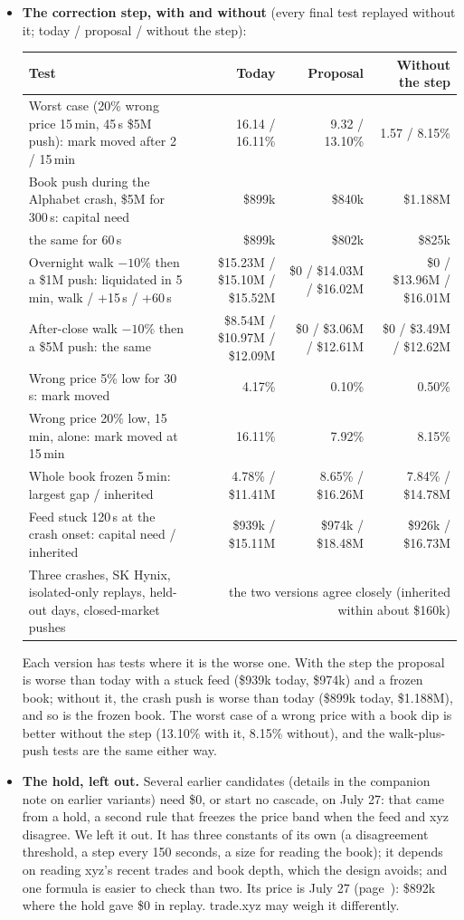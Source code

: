 \documentclass[10.5pt,a4paper]{article}
\begin{document}
{\begin{itemize}[leftmargin=1.2em,itemsep=.2ex,topsep=.3ex]
\item \textbf{The correction step, with and without} (every final test replayed without it; today / proposal / without the step):\par
{\footnotesize\begin{tabularx}{\linewidth}{@{}>{\raggedright\arraybackslash}Xrrr@{}}
\toprule
Test & Today & Proposal & Without the step\\
\midrule
Worst case (20\% wrong price 15\,min, 45\,s \$5M push): mark moved after 2 / 15\,min & 16.14 / 16.11\% & 9.32 / 13.10\% & 1.57 / 8.15\%\\
Book push during the Alphabet crash, \$5M for 300\,s: capital need & \$899k & \$840k & \$1.188M\\
\quad the same for 60\,s & \$899k & \$802k & \$825k\\
Overnight walk $-10\%$ then a \$1M push: liquidated in 5\,min, walk / +15\,s / +60\,s & \$15.23M / \$15.10M / \$15.52M & \$0 / \$14.03M / \$16.02M & \$0 / \$13.96M / \$16.01M\\
After-close walk $-10\%$ then a \$5M push: the same & \$8.54M / \$10.97M / \$12.09M & \$0 / \$3.06M / \$12.61M & \$0 / \$3.49M / \$12.62M\\
Wrong price 5\% low for 30\,s: mark moved & 4.17\% & 0.10\% & 0.50\%\\
Wrong price 20\% low, 15\,min, alone: mark moved at 15\,min & 16.11\% & 7.92\% & 8.15\%\\
Whole book frozen 5\,min: largest gap / inherited & 4.78\% / \$11.41M & 8.65\% / \$16.26M & 7.84\% / \$14.78M\\
Feed stuck 120\,s at the crash onset: capital need / inherited & \$939k / \$15.11M & \$974k / \$18.48M & \$926k / \$16.73M\\
Three crashes, SK Hynix, isolated-only replays, held-out days, closed-market pushes & \multicolumn{3}{r}{the two versions agree closely (inherited within about \$160k)}\\
\bottomrule
\end{tabularx}}\par
Each version has tests where it is the worse one. With the step the proposal is worse than today with a stuck feed (\$939k today, \$974k) and a frozen book; without it, the crash push is worse than today (\$899k today, \$1.188M), and so is the frozen book. The worst case of a wrong price with a book dip is better without the step (13.10\% with it, 8.15\% without), and the walk-plus-push tests are the same either way.
\item \textbf{The hold, left out.} Several earlier candidates (details in the companion note on earlier variants) need \$0, or start no cascade, on July 27: that came from a hold, a second rule that freezes the price band when the feed and xyz disagree. We left it out. It has three constants of its own (a disagreement threshold, a step every 150 seconds, a size for reading the book); it depends on reading xyz's recent trades and book depth, which the design avoids; and one formula is easier to check than two. Its price is July 27 (page~\pageref{sec:skhx2}): \$892k where the hold gave \$0 in replay. trade.xyz may weigh it differently.

\end{itemize}}
\end{document}
